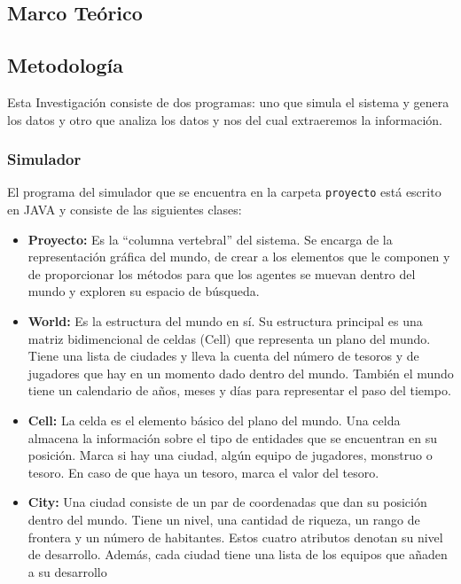 \subsection*{Marco Teórico}{}
\subsection*{Metodología}{
    Esta Investigación consiste de dos programas: uno que simula el sistema y
    genera los datos y otro que analiza los datos y nos del cual extraeremos la
    información.
    \subsubsection*{Simulador}{El programa del simulador que se encuentra en la
        carpeta \texttt{proyecto} está escrito en JAVA y consiste de las
        siguientes clases:
        \begin{itemize}
        \item{\textbf{Proyecto: }Es la ``columna vertebral'' del sistema. Se
            encarga de la representación gráfica del mundo, de crear a los
            elementos que le componen y de proporcionar los métodos para que los
            agentes se muevan dentro del mundo y exploren su espacio de
            búsqueda.
        }
        \item{\textbf{World: }Es la estructura del mundo en sí. Su estructura
            principal es una matriz bidimencional de celdas (Cell) que
            representa un plano del mundo. Tiene una lista de ciudades y lleva
            la cuenta del número de tesoros y de jugadores que hay en un momento
            dado dentro del mundo. También el mundo tiene un calendario de años,
            meses y días para representar el paso del tiempo.
        }
        \item{\textbf{Cell: }La celda es el elemento básico del plano del mundo.
            Una celda almacena la información sobre el tipo de entidades que se
            encuentran en su posición. Marca si hay una ciudad, algún equipo de
            jugadores, monstruo o tesoro. En caso de que haya un tesoro, marca
            el valor del tesoro.
        }
        \item{\textbf{City: }Una ciudad consiste de un par de coordenadas que
            dan su posición dentro del mundo. Tiene un nivel, una cantidad de
            riqueza, un rango de frontera y un número de habitantes. Estos
            cuatro atributos denotan su nivel de desarrollo. Además, cada
            ciudad tiene una lista de los equipos que añaden a su desarrollo
}
\end{itemize}}}

